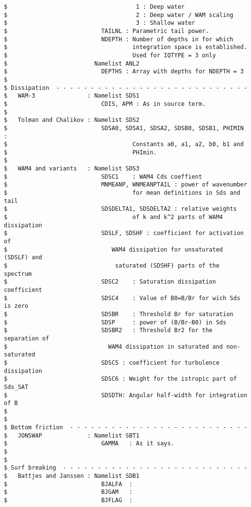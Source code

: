 \begin{verbatim}
$                                     1 : Deep water
$                                     2 : Deep water / WAM scaling
$                                     3 : Shallow water
$                           TAILNL : Parametric tail power.
$                           NDEPTH : Number of depths in for which
$                                    integration space is established.
$                                    Used for IQTYPE = 3 only
$                         Namelist ANL2
$                           DEPTHS : Array with depths for NDEPTH = 3
$
$ Dissipation  - - - - - - - - - - - - - - - - - - - - - - - - - - - -
$   WAM-3               : Namelist SDS1
$                           CDIS, APM : As in source term.
$
$   Tolman and Chalikov : Namelist SDS2
$                           SDSA0, SDSA1, SDSA2, SDSB0, SDSB1, PHIMIN :
$                                    Constants a0, a1, a2, b0, b1 and
$                                    PHImin.
$
$   WAM4 and variants   : Namelist SDS3
$                           SDSC1    : WAM4 Cds coeffient
$                           MNMEANP, WNMEANPTAIL : power of wavenumber
$                                    for mean definitions in Sds and tail 
$                           SDSDELTA1, SDSDELTA2 : relative weights 
$                                    of k and k^2 parts of WAM4 dissipation
$                           SDSLF, SDSHF : coefficient for activation of 
$                              WAM4 dissipation for unsaturated (SDSLF) and 
$                               saturated (SDSHF) parts of the spectrum
$                           SDSC2    : Saturation dissipation coefficient
$                           SDSC4    : Value of B0=B/Br for wich Sds is zero
$                           SDSBR    : Threshold Br for saturation
$                           SDSP     : power of (B/Br-B0) in Sds
$                           SDSBR2   : Threshold Br2 for the separation of 
$                             WAM4 dissipation in saturated and non-saturated
$                           SDSC5 : coefficient for turbulence dissipation
$                           SDSC6 : Weight for the istropic part of Sds_SAT
$                           SDSDTH: Angular half-width for integration of B
$
$
$ Bottom friction  - - - - - - - - - - - - - - - - - - - - - - - - - -
$   JONSWAP             : Namelist SBT1
$                           GAMMA   : As it says.
$
$
$ Surf breaking  - - - - - - - - - - - - - - - - - - - - - - - - - - -
$   Battjes and Janssen : Namelist SDB1
$                           BJALFA  :
$                           BJGAM   :
$                           BJFLAG  :

\end{verbatim}
